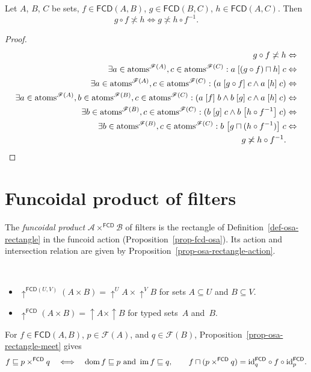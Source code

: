 \begin{thm}
\label{fcd-cross}Let $A$, $B$, $C$ be sets, $f\in\mathsf{FCD}(A,B)$,
$g\in\mathsf{FCD}(B,C)$, $h\in\mathsf{FCD}(A,C)$. Then
\[
g\circ f\nasymp h\Leftrightarrow g\nasymp h\circ f^{-1}.
\]
\end{thm}
\begin{proof}
~
\begin{align*}
g\circ f\not\asymp h & \Leftrightarrow\\
\exists a\in\operatorname{atoms}^{\mathscr{F}(A)},c\in\operatorname{atoms}^{\mathscr{F}(C)}:a\mathrel{\left[(g\circ
f)\sqcap h\right]}c & \Leftrightarrow\\
\exists a\in\operatorname{atoms}^{\mathscr{F}(A)},c\in\operatorname{atoms}^{\mathscr{F}(C)}:(a\mathrel{\left[g\circ
f\right]}c\land a\mathrel{\left[h\right]}c) & \Leftrightarrow\\
\exists
a\in\operatorname{atoms}^{\mathscr{F}(A)},b\in\operatorname{atoms}^{\mathscr{F}(B)},c\in\operatorname{atoms}^{\mathscr{F}
(C)}:(a\mathrel{\left[f\right]}b\land b\mathrel{\left[g\right]}c\land a\mathrel{\left[h\right]}c) & \Leftrightarrow\\
\exists b\in\operatorname{atoms}^{\mathscr{F}(B)},c\in\operatorname{atoms}^{\mathscr{F}(C)}:(b\mathrel{\left[g\right]}c\land b\mathrel{\left[h\circ f^{-1}\right]}c) & \Leftrightarrow\\
\exists
b\in\operatorname{atoms}^{\mathscr{F}(B)},c\in\operatorname{atoms}^{\mathscr{F}(C)}:b\mathrel{\left[g\sqcap(h\circ
f^{-1})\right]}c & \Leftrightarrow\\
g\not\asymp h\circ f^{-1}.
\end{align*}

\end{proof}

\section{Funcoidal product of filters}

The \emph{funcoidal product}
$\mathcal A\times^{\mathsf{FCD}}\mathcal B$ of filters is the
rectangle of Definition~\ref{def-osa-rectangle} in the funcoid action
(Proposition~\ref{prop-fcd-osa}). Its action and intersection relation
are given by Proposition~\ref{prop-osa-rectangle-action}.

\begin{obvious}
~
\begin{itemize}
\item $\uparrow^{\mathsf{FCD}(U,V)}(A\times B)=\uparrow^{U}A\times\uparrow^{V}B$
for sets $A\subseteq U$ and $B\subseteq V$.
\item $\uparrow^{\mathsf{FCD}}(A\times B)=\uparrow A\times\uparrow B$ for
typed sets~$A$ and~$B$.
\end{itemize}
\end{obvious}
For $f\in\mathsf{FCD}(A,B)$, $p\in\mathscr F(A)$, and $q\in\mathscr F(B)$,
Proposition~\ref{prop-osa-rectangle-meet} gives
\[
 f\sqsubseteq p\times^{\mathsf{FCD}}q
 \quad\Longleftrightarrow\quad\operatorname{dom} f\sqsubseteq p\text{ and }\operatorname{im} f\sqsubseteq q,
 \qquad
 f\sqcap(p\times^{\mathsf{FCD}}q)
 ={\operatorname{id}}_q^{\mathsf{FCD}}\circ f\circ{\operatorname{id}}_p^{\mathsf{FCD}}.
\]

